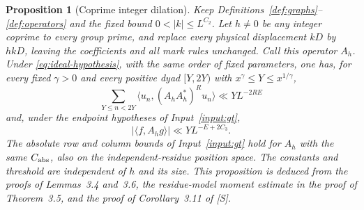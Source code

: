 \documentclass[11pt]{article}
\newtheorem{proposition}[theorem]{Proposition}
\theoremstyle{definition}
\theoremstyle{remark}
\begin{document}
\begin{proposition}[Coprime integer dilation]\label{prop:dilation}
Keep Definitions~\ref{def:graphs}--\ref{def:operators} and the fixed
bound $0<|k|\le L^{C_2}$. Let $h\ne0$ be any integer coprime to every
group prime, and replace every physical displacement $kD$ by $hkD$,
leaving the coefficients and all mark rules unchanged. Call this
operator $A_h$. Under \eqref{eq:ideal-hypothesis}, with the same order
of fixed parameters, one has, for every fixed $\gamma>0$ and every positive dyad $[Y,2Y)$ with $x^\gamma\le Y\le x^{1/\gamma}$,
\begin{equation}\label{eq:dilated-moment}
\sum_{Y\le n<2Y}\langle u_n,(A_hA_h^*)^Ru_n\rangle
\ll YL^{-2RE}
\end{equation}
and, under the endpoint hypotheses of Input~\ref{input:gt},
\begin{equation}\label{eq:dilated-pairing}
|\langle f,A_hg\rangle|\ll YL^{-E+2C_3}.
\end{equation}
The absolute row and column bounds of Input~\ref{input:gt} hold for
$A_h$ with the same $C_{\rm abs}$, also on the independent-residue
position space. The constants and threshold are independent of $h$
and its size. This proposition is deduced from the proofs of
Lemmas~3.4 and~3.6, the residue-model moment estimate in the proof of
Theorem~3.5, and the proof of Corollary~3.11 of [S].
\end{proposition}
\end{document}
